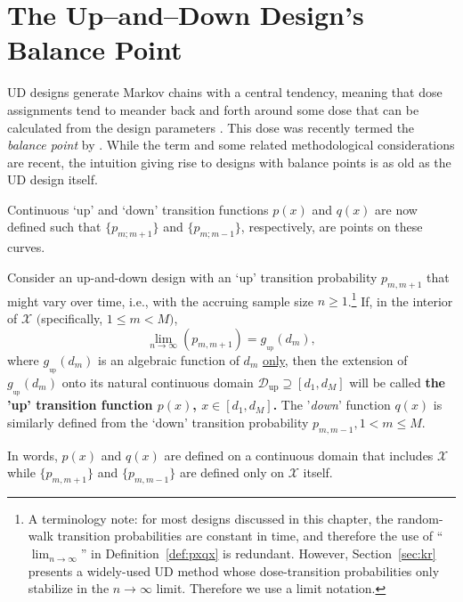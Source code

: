 
\section{The Up--and--Down Design's Balance Point}\label{sec:balpoint}

UD designs generate Markov chains with a central tendency, meaning that dose assignments tend to meander back and forth around some dose that can be calculated from the design parameters \citep{Durh:Flou:rand:1994,Hugh:Rand:1995}. This dose was recently termed the \emph{balance point} by \cite{Oron:Hoff:thek:2009}. While the term and some related methodological considerations are recent, the intuition giving rise to designs with balance points is as old as the UD design itself.

Continuous `up' and `down' transition functions $p(x)$ and $q(x)$ are now defined such that
$\{p_{m;m+1}\}$ and $\{p_{m;m-1}\}$, respectively, are points on these curves.
%
\begin{defn}\label{def:pxqx}
Consider an up-and-down design with an `up' transition probability  $p_{m,m+1}$ that might vary over time, i.e., with the accruing sample size $n\geq 1$.\footnote{A terminology note: for most designs discussed in this chapter, the random-walk transition probabilities are constant in time, and therefore the use of ``$\lim_{n\to\infty}$'' in Definition~\ref{def:pxqx} is redundant. However, Section~\ref{sec:kr} presents a widely-used UD method whose dose-transition probabilities only stabilize in the $n\to\infty$ limit. Therefore we use a limit notation.} If, in the interior of $\mathcal{X}$ $($specifically, $1\leq m<M)$, $$\lim_{n\to\infty}\left(p_{m,m+1}\right)=g_{_\mathrm{up}}\left(d_m\right),$$
where $g_{_\mathrm{up}}\left(d_m\right)$ is an algebraic function of $d_m$  \underline{only}, then the extension of $g_{_\mathrm{up}}\left(d_m\right)$ onto its natural continuous domain $\mathcal{D}{_\mathrm{up}}\supseteq\left[d_1,d_M\right]$ will be called \textbf{the 'up' transition function $p(x)$, $x\in\left[d_1,d_M\right]$.} The '\emph{down}' function $q(x)$ is similarly defined from the `down' transition probability $p_{m,m-1}, 1<m\leq M$.
\end{defn}
%
\noindent In words, $p(x)$ and $q(x)$ are defined on a continuous domain that includes $\mathcal{X}$ while $\{p_{m,m+1}\}$ and $\{p_{m,m-1}\}$ are defined only on $\mathcal{X}$ itself.


